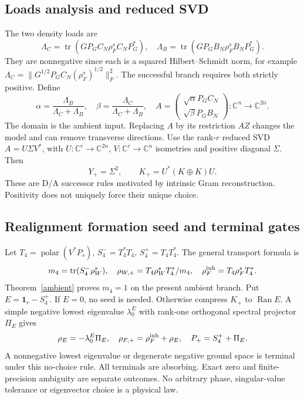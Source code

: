 \documentclass[11pt,letterpaper]{article}
\newcommand{\tr}{\operatorname{tr}}
\newcommand{\Ran}{\operatorname{Ran}}
\newcommand{\pol}{\operatorname{polar}}
\newcommand{\Id}{\mathbf 1}
\newcommand{\C}{\mathbb C}\newcommand{\R}{\mathbb R}
\theoremstyle{definition}
\numberwithin{equation}{section}
\begin{document}
\subsection{Loads analysis and reduced SVD}
The two density loads are
\begin{equation}\label{loads}
\Lambda_C=\tr(GP_GC_N\rho_F^s C_NP_G^*),\quad
\Lambda_B=\tr(GP_GB_N\rho_F^s B_NP_G^*).
\end{equation}
They are nonnegative since each is a squared Hilbert--Schmidt norm, for example $\Lambda_C=\|G^{1/2}P_GC_N(\rho_F^s)^{1/2}\|_F^2$. The successful branch requires both strictly positive. Define
\begin{equation}
\alpha=\frac{\Lambda_B}{\Lambda_C+\Lambda_B},\quad
\beta=\frac{\Lambda_C}{\Lambda_C+\Lambda_B},\quad
A=\begin{pmatrix}\sqrt\alpha P_GC_N\\\sqrt\beta P_GB_N\end{pmatrix}:\C^n\to\C^{2n}.
\end{equation}
The domain is the ambient input. Replacing $A$ by its restriction $AZ$ changes the model and can remove transverse directions. Use the rank-$r$ reduced SVD $A=U\Sigma V^*$, with $U:\C^r\to\C^{2n}$, $V:\C^r\to\C^n$ isometries and positive diagonal $\Sigma$. Then
\begin{equation}\label{kernelnext}
Y_+=\Sigma^2,\qquad K_+=U^*(K\oplus K)U.
\end{equation}
These are D/A successor rules motivated by intrinsic Gram reconstruction. Positivity does not uniquely force their unique choice.

\subsection{Realignment formation seed and terminal gates}
Let $T_4=\pol(V^*P_s)$, $S_4^-=T_4^*T_4$, $S_4^+=T_4T_4^*$. The general transport formula is
\begin{equation}
m_4=\tr(S_4^-\rho_W^s),\quad
\rho_{W,+}=T_4\rho_W^sT_4^*/m_4,\quad
\rho_F^{\rm inh}=T_4\rho_F^sT_4^*.
\end{equation}
Theorem~\ref{ambient} proves $m_4=1$ on the present ambient branch. Put $E=\Id_r-S_4^+$. If $E=0$, no seed is needed. Otherwise compress $K_+$ to $\Ran E$. A simple negative lowest eigenvalue $\lambda_0^E$ with rank-one orthogonal spectral projector $\Pi_E$ gives
\begin{equation}
\rho_E=-\lambda_0^E\Pi_E,\quad
\rho_{F,+}=\rho_F^{\rm inh}+\rho_E,\quad P_+=S_4^++\Pi_E.
\end{equation}
A nonnegative lowest eigenvalue or degenerate negative ground space is terminal under this no-choice rule. All terminals are absorbing. Exact zero and finite-precision ambiguity are separate outcomes. No arbitrary phase, singular-value tolerance or eigenvector choice is a physical law.
\end{document}
